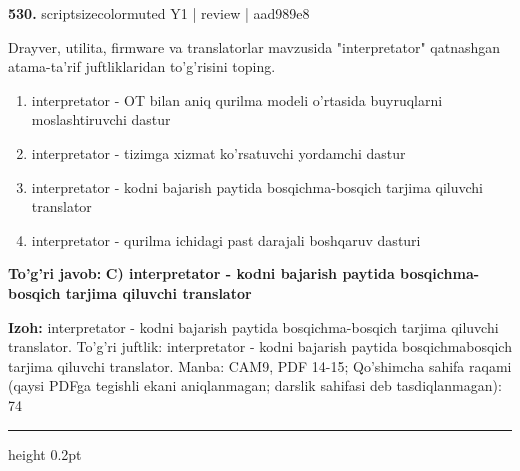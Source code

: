 \documentclass[10pt,a4paper]{article}
\begin{document}
{\bfseries\sffamily\color{ink} 530.} {scriptsizecolor{muted} Y1 | review | aad989e8}
\par
Drayver, utilita, firmware va translatorlar mavzusida "interpretator" qatnashgan atama-ta'rif juftliklaridan to'g'risini toping.
\begin{enumerate}[label=\Alph*),leftmargin=9mm]
\item interpretator - OT bilan aniq qurilma modeli o'rtasida buyruqlarni moslashtiruvchi dastur
\item interpretator - tizimga xizmat ko'rsatuvchi yordamchi dastur
\item interpretator - kodni bajarish paytida bosqichma-bosqich tarjima qiluvchi translator
\item interpretator - qurilma ichidagi past darajali boshqaruv dasturi
\end{enumerate}
\begin{tcolorbox}[enhanced,breakable,colback=teal!4,colframe=teal!60!black,boxrule=0.45pt,arc=1.2mm,left=2.7mm,right=2.7mm,top=1.8mm,bottom=1.8mm,before skip=2mm,after skip=2mm]
{\bfseries\sffamily\color{teal}To'g'ri javob:} \textbf{C) interpretator - kodni bajarish paytida bosqichma-bosqich tarjima qiluvchi translator}
\par\smallskip
{\bfseries Izoh:} interpretator - kodni bajarish paytida bosqichma-bosqich tarjima qiluvchi translator. To'g'ri juftlik: interpretator - kodni bajarish paytida bosqichmabosqich tarjima qiluvchi translator. Manba: CAM9, PDF 14-15; Qo'shimcha sahifa raqami (qaysi PDFga tegishli ekani aniqlanmagan; darslik sahifasi deb tasdiqlanmagan): 74
\end{tcolorbox}
\vspace{2mm}\hrule height 0.2pt\vspace{3mm}
\end{document}
